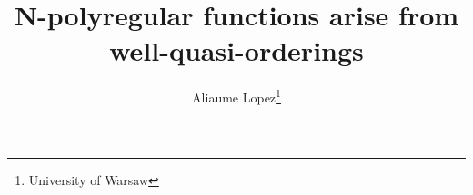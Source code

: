 %

\title{N-polyregular functions arise from well-quasi-orderings}
\author{%
        Aliaume Lopez\thanks{University of Warsaw}
    }


\newcommand{\makeabstract}{
\begin{abstract}
    A fundamental construction in formal language theory is the
    Myhill-Nerode congruence on words, whose finitedness characterizes
    regular language. This construction was generalized to functions
    from \(\Sigma^*\) to \(\mathbb{Z}\) by Colcombet, Douéneau-Tabot,
    and Lopez to characterize the class of so-called
    \(\mathbb{Z}\)-polyregular functions. In this paper, we relax the
    notion of equivalence relation to quasi-ordering in order to study
    the class of functions from \(\Sigma^*\) to \(\mathbb{N}\). The
    analogue of having a finite index is then being a
    well-quasi-ordering.
\end{abstract}
}

